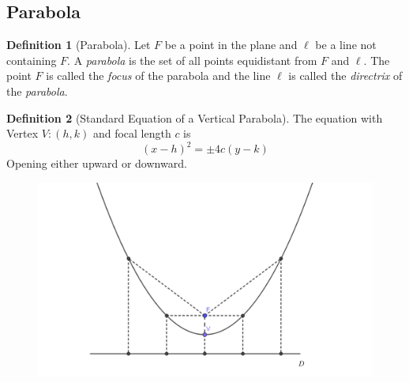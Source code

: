 \documentclass[a4paper]{article}
\theoremstyle{definition}
\newtheorem*{defi}{Definition}
\begin{document}
\subsection{Parabola}

\begin{defi}[Parabola]
    Let $F$ be a point in the plane and $\ell$ be a line not containing $F$. A
     \emph{parabola} is the set of all points equidistant from $F$ and $\ell$.
     The point $F$ is called the \emph{focus} of the parabola and the line
     $\ell$ is called the \emph{directrix} of the \emph{parabola}.
\end{defi}
\begin{defi}[Standard Equation of a Vertical Parabola]
     The equation with Vertex $V:(h,k)$ and focal length $c$ is
     \begin{equation*}
          (x-h)^2 = \pm4c(y-k)
     \end{equation*}
     Opening either upward or downward.
\end{defi}

\begin{figure}[h]
     \centering
     \includegraphics{parabola1.png}
\end{figure}
\end{document}
